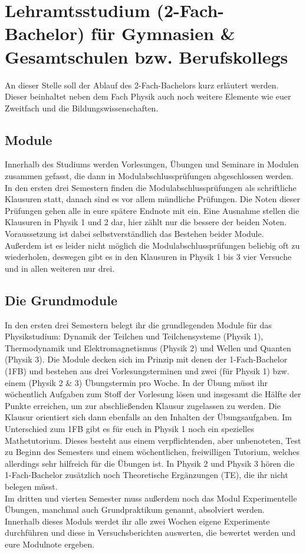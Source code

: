 \section[Lehramtsstudium (2-Fach-Bachelor) für Gymnasien \& Gesamtschulen bzw. Berufskollegs]{Lehramtsstudium (2-Fach-Bachelor) für Gymnasien \& Gesamtschulen bzw. Berufskollegs}

\begin{multicols*}{2}
An dieser Stelle soll der Ablauf des 2-Fach-Bachelors kurz erläutert werden. Dieser beinhaltet neben dem Fach Physik auch noch weitere Elemente wie euer Zweitfach und die Bildungswissenschaften.
\subsection*{Module}
Innerhalb des Studiums werden Vorlesungen, Übungen und Seminare in Modulen zusammen gefasst, die dann in Modulabschlussprüfungen abgeschlossen werden. In den ersten drei Semestern finden die Modulabschlussprüfungen als schriftliche Klausuren statt, danach sind es vor allem mündliche Prüfungen. Die Noten dieser Prüfungen gehen alle in eure spätere Endnote mit ein. Eine Ausnahme stellen die Klausuren in Physik 1 und 2 dar, hier zählt nur die bessere der beiden Noten. Voraussetzung ist dabei selbstverständlich das Bestehen beider Module. Außerdem ist es leider nicht möglich die Modulabschlussprüfungen beliebig oft zu wiederholen, deswegen gibt es in den Klausuren in Physik 1 bis 3 vier Versuche und in allen weiteren nur drei.
\subsection*{Die Grundmodule}
In den ersten drei Semestern belegt ihr die grundlegenden Module für das Physikstudium: Dynamik der Teilchen und Teilchensysteme (Physik 1), Thermodynamik und Elektromagnetismus (Physik 2) und Wellen und Quanten (Physik 3). Die Module decken sich im Prinzip mit denen der 1-Fach-Bachelor (1FB) und bestehen aus drei Vorlesungsterminen und zwei (für Physik 1) bzw. einem (Physik 2 \& 3) Übungstermin pro Woche. In der Übung müsst ihr wöchentlich Aufgaben zum Stoff der Vorlesung lösen und insgesamt die Hälfte der Punkte erreichen, um zur abschließenden Klausur zugelassen zu werden. Die Klausur orientiert sich dann ebenfalls an den Inhalten der Übungsaufgaben. Im Unterschied zum 1FB gibt es für euch in Physik 1 noch ein spezielles Mathetutorium. Dieses besteht aus einem verpflichtenden, aber unbenoteten, Test zu Beginn des Semesters und einem wöchentlichen, freiwilligen Tutorium, welches allerdings sehr hilfreich für die Übungen ist. In Physik 2 und Physik 3 hören die 1-Fach-Bachelor zusätzlich noch Theoretische Ergänzungen (TE), die ihr nicht belegen müsst.\\
Im dritten und vierten Semester muss außerdem noch das Modul Experimentelle Übungen, manchmal auch Grundpraktikum genannt, absolviert werden. Innerhalb dieses Moduls werdet ihr alle zwei Wochen eigene Experimente durchführen und diese in Versuchsberichten auswerten, die bewertet werden und eure Modulnote ergeben.

\end{multicols*}
